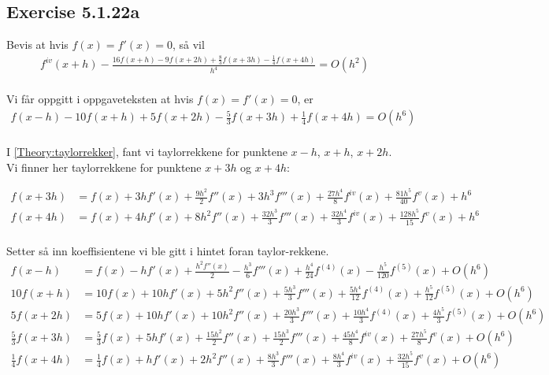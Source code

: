  
\subsection{Exercise 5.1.22a}
\label{sec:oppgave22a}

Bevis at hvis $f(x) = f'(x) = 0$, så vil 
\begin{multline}
{f^{iv}}(x + h) - \frac{{16f(x + h) - 9f(x + 2h) + \frac{8}{3}f(x + 3h) - \frac{1}{4}f(x + 4h)}}{{{h^4}}} = O({h^2})  
\label{eq22a:oppg} \\
\end{multline}

Vi får oppgitt i oppgaveteksten at hvis $f(x) = f'(x) = 0$, er
\begin{align}
f(x-h)-10f(x+h)+5f(x+2h)-\frac{5}{3}f(x+3h)+\frac{1}{4}f(x+4h)=O(h^6) 
\label{eq22a:hint} \\ \nonumber
\end{align}

I \ref{Theory:taylorrekker}, fant vi taylorrekkene for punktene $x-h$, $x+h$, $x+2h$. Vi finner her taylorrekkene for punktene $x+3h$ og $x+4h$: 

\begin{align}
f(x+3h) &= f(x) + 3hf'(x) + \frac{{9{h^2}}}{2}f''(x) + 3{h^3}f'''(x) + \frac{{27{h^4}}}{8}{f^{iv}}(x) + \frac{{81{h^5}}}{40}{f^v}(x) + {h^6} \nonumber \\ 
f(x+4h) &= f(x) + 4hf'(x) + 8{h^2}f''(x) + \frac{{32{h^3}}}{3}f'''(x) + \frac{{32{h^4}}}{3}{f^{iv}}(x) + \frac{{128{h^5}}}{{15}}{f^v}(x) + {h^6}\nonumber \\ \nonumber
\end{align}


Setter så inn koeffisientene vi ble gitt i hintet foran taylor-rekkene. 
\begin{align}
 f(x-h)&=f(x)-hf'(x)+\frac{h^2f''(x)}{2}-\frac{h^3}{6}f'''(x)+\frac{h^4}{24}f^{(4)}(x)-\frac{h^5}{120}f^{(5)}(x)+O(h^6)\nonumber \\
10f(x + h) &= 10f(x) + 10hf'(x) + 5{h^2}f''(x) + \frac{{5{h^3}}}{3}f'''(x) + \frac{{5{h^4}}}{{12}}{f^{(4)}}(x) + \frac{{{h^5}}}{{12}}{f^{(5)}}(x) + O(h^6) \nonumber\\
5f(x + 2h) &= 5f(x) + 10hf'(x) + 10{h^2}f''(x) + \frac{{20{h^3}}}{3}f'''(x) + \frac{{10{h^4}}}{3}{f^{(4)}}(x) + \frac{{4{h^5}}}{3}{f^{(5)}}(x) + O(h^6) \nonumber \\
\frac{5}{3}f(x + 3h) &= \frac{5}{3}f(x) + 5hf'(x) + \frac{{15{h^2}}}{2}f''(x) + \frac{15h^3}{2}f'''(x) + \frac{{45{h^4}}}{8}{f^{iv}}(x) + \frac{{27{h^5}}}{8}{f^v}(x) + O(h^6) \nonumber \\ 
\frac{1}{4}f(x + 4h) &= \frac{1}{4}f(x) + hf'(x) + 2{h^2}f''(x) + \frac{{8{h^3}}}{3}f'''(x) + \frac{{8{h^4}}}{3}{f^{iv}}(x) + \frac{{32{h^5}}}{{15}}{f^v}(x) + O(h^6) \nonumber 
\end{align}
\newpage


